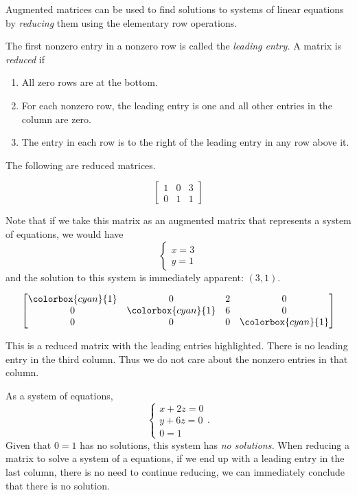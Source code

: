 Augmented matrices can be used to find solutions to systems of linear equations by \emph{reducing} them using the elementary row operations.

\begin{definition}
The first nonzero entry in a nonzero row is called the \emph{leading entry.} A matrix is \emph{reduced} if
\begin{enumerate}
    \item All zero rows are at the bottom.
    \item For each nonzero row, the leading entry is one and all other entries in the column are zero.
    \item The entry in each row is to the right of the leading entry in any row above it.
\end{enumerate}
\end{definition}

\begin{example}
    The following are reduced matrices.
    
    \[\begin{bmatrix}
        1 & 0 & 3 \\
        0 & 1 & 1
    \end{bmatrix}\]

    Note that if we take this matrix as an augmented matrix that represents a system of equations, we would have
    \[\begin{cases}
        x = 3 \\
        y = 1
    \end{cases}\]
    and the solution to this system is immediately apparent: \(\left(3,1\right).\)
\end{example}
\begin{example}

    \[\begin{bmatrix}
        \colorbox{cyan}{1} & 0 & 2 & 0 \\
        0 & \colorbox{cyan}{1} & 6 & 0 \\
        0 & 0 & 0 & \colorbox{cyan}{1}
    \end{bmatrix}\]

    This is a reduced matrix with the leading entries highlighted. There is no leading entry in the third column. Thus we do not care about the nonzero entries in that column.

    As a system of equations,
    \[\begin{cases}
        x + 2z = 0 \\
        y + 6z = 0 \\
        0=1
    \end{cases}.\]
    Given that \(0=1\) has no solutions, this system has \emph{no solutions.} When reducing a matrix to solve a system of a equations, if we end up with a leading entry in the last column, there is no need to continue reducing, we can immediately conclude that there is no solution.
\end{example}

